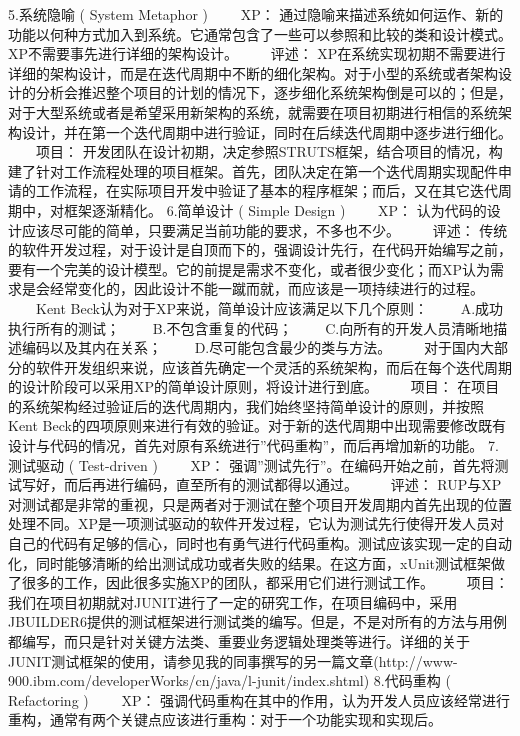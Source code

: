 \documentclass[UTF8]{../computerUniverse}
\begin{document}
5.系统隐喻 ( System Metaphor )
　　XP： 通过隐喻来描述系统如何运作、新的功能以何种方式加入到系统。它通常包含了一些可以参照和比较的类和设计模式。XP不需要事先进行详细的架构设计。
　　评述： XP在系统实现初期不需要进行详细的架构设计，而是在迭代周期中不断的细化架构。对于小型的系统或者架构设计的分析会推迟整个项目的计划的情况下，逐步细化系统架构倒是可以的；但是，对于大型系统或者是希望采用新架构的系统，就需要在项目初期进行相信的系统架构设计，并在第一个迭代周期中进行验证，同时在后续迭代周期中逐步进行细化。
　　项目： 开发团队在设计初期，决定参照STRUTS框架，结合项目的情况，构建了针对工作流程处理的项目框架。首先，团队决定在第一个迭代周期实现配件申请的工作流程，在实际项目开发中验证了基本的程序框架；而后，又在其它迭代周期中，对框架逐渐精化。
6.简单设计 ( Simple Design )
　　XP： 认为代码的设计应该尽可能的简单，只要满足当前功能的要求，不多也不少。
　　评述： 传统的软件开发过程，对于设计是自顶而下的，强调设计先行，在代码开始编写之前，要有一个完美的设计模型。它的前提是需求不变化，或者很少变化；而XP认为需求是会经常变化的，因此设计不能一蹴而就，而应该是一项持续进行的过程。
　　Kent Beck认为对于XP来说，简单设计应该满足以下几个原则：
　　A.成功执行所有的测试；
　　B.不包含重复的代码；
　　C.向所有的开发人员清晰地描述编码以及其内在关系；
　　D.尽可能包含最少的类与方法。
　　对于国内大部分的软件开发组织来说，应该首先确定一个灵活的系统架构，而后在每个迭代周期的设计阶段可以采用XP的简单设计原则，将设计进行到底。
　　项目： 在项目的系统架构经过验证后的迭代周期内，我们始终坚持简单设计的原则，并按照Kent Beck的四项原则来进行有效的验证。对于新的迭代周期中出现需要修改既有设计与代码的情况，首先对原有系统进行”代码重构”，而后再增加新的功能。
7.测试驱动 ( Test-driven )
　　XP： 强调”测试先行”。在编码开始之前，首先将测试写好，而后再进行编码，直至所有的测试都得以通过。
　　评述： RUP与XP对测试都是非常的重视，只是两者对于测试在整个项目开发周期内首先出现的位置处理不同。XP是一项测试驱动的软件开发过程，它认为测试先行使得开发人员对自己的代码有足够的信心，同时也有勇气进行代码重构。测试应该实现一定的自动化，同时能够清晰的给出测试成功或者失败的结果。在这方面，xUnit测试框架做了很多的工作，因此很多实施XP的团队，都采用它们进行测试工作。
　　项目： 我们在项目初期就对JUNIT进行了一定的研究工作，在项目编码中，采用JBUILDER6提供的测试框架进行测试类的编写。但是，不是对所有的方法与用例都编写，而只是针对关键方法类、重要业务逻辑处理类等进行。详细的关于JUNIT测试框架的使用，请参见我的同事撰写的另一篇文章(http://www-900.ibm.com/developerWorks/cn/java/l-junit/index.shtml)
8.代码重构 ( Refactoring )
　　XP： 强调代码重构在其中的作用，认为开发人员应该经常进行重构，通常有两个关键点应该进行重构：对于一个功能实现和实现后。
\end{document}
